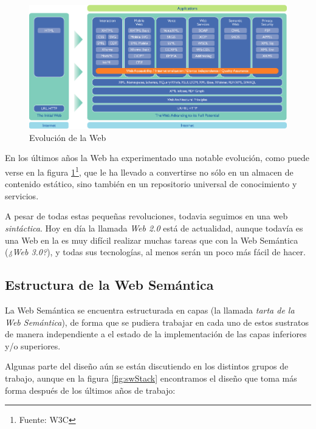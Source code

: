 \begin{figure}[H]
	\centering
	\includegraphics[width=12cm]{images/web-evolution.png}
	\caption{Evolución de la Web}
	\label{fig:evoWeb}
\end{figure}

En los últimos años la Web ha experimentado una notable evolución, como puede 
verse en la figura \ref{fig:evoWeb}\footnote{Fuente: W3C}, que le ha llevado a 
convertirse no sólo en un almacen de contenido estático, sino también en un 
repositorio universal de conocimiento y servicios.

A pesar de todas estas pequeñas revoluciones, todavia seguimos en una web 
\emph{sintáctica}. Hoy en día la llamada \emph{Web 2.0}\cite{O'Reilly2005} está
de actualidad, aunque todavía es una Web en la es muy difícil realizar muchas 
tareas que con la Web Semántica (\emph{¿Web 3.0?}), y todas sus tecnologías, 
al menos serán un poco más fácil de hacer.

\subsection{Estructura de la Web Semántica}

La Web Semántica se encuentra estructurada en capas (la llamada \emph{tarta de 
la Web Semántica}), de forma que se pudiera trabajar en cada uno de estos
sustratos de manera independiente a el estado de la implementación de las
capas inferiores y/o superiores.

Algunas parte del diseño aún se están discutiendo en los distintos grupos de
trabajo, aunque en la figura \ref{fig:swStack} encontramos el diseño que toma
más forma después de los últimos años de trabajo:

